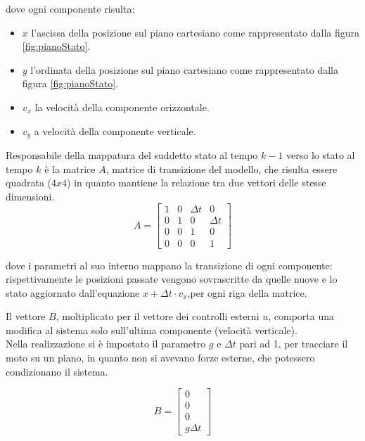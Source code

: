 dove ogni componente risulta:
\begin{itemize}
\item $x$ l'ascissa della posizione sul piano cartesiano come rappresentato dalla figura \ref{fig:pianoStato}.
\item $y$ l'ordinata della posizione sul piano cartesiano come rappresentato dalla figura \ref{fig:pianoStato}.
\item $v_x$ la velocità della componente orizzontale.
\item $v_y$ a velocità della componente verticale.
\end{itemize}

Responsabile della mappatura del suddetto stato al tempo $k-1$ verso lo stato al tempo $k$ è la matrice $A$, matrice di transizione del modello, che risulta essere quadrata ($4 x 4$) in quanto mantiene la relazione tra due vettori delle stesse dimensioni.
\begin{equation}\label{eq:matriceA}
 A = 
\begin{bmatrix}
 1 & 0 & \Delta t & 0 \\
 0 & 1 & 0 & \Delta t \\
 0 & 0 & 1 & 0 \\
 0 & 0 & 0 & 1
\end{bmatrix}
\end{equation} 

dove i parametri al suo interno mappano la transizione di ogni componente: rispettivamente le posizioni passate vengono sovrascritte da quelle nuove e lo stato aggiornato dall'equazione $x + \Delta t \cdot v_x$,per ogni riga della matrice.

Il vettore $B$, moltiplicato per il vettore dei controlli esterni $u$, comporta una modifica al sistema solo sull'ultima componente (velocità verticale).\\%
Nella realizzazione si è impostato il parametro $g$  e $ \Delta t$ pari ad 1, per tracciare il moto su un piano, in quanto non si avevano forze esterne, che potessero condizionano il sistema. 

\begin{equation}
 B =\begin{bmatrix} 0 \\ 0 \\ 0 \\ g \Delta t \end{bmatrix}\end{equation} 

